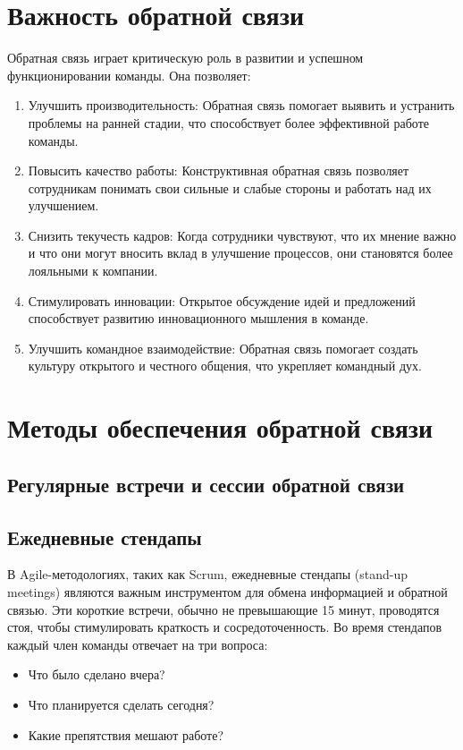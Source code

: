    \section{Важность обратной связи}
    Обратная связь играет критическую роль в развитии и успешном функционировании команды. Она позволяет:
    \begin{enumerate}
        \item Улучшить производительность: Обратная связь помогает выявить и устранить проблемы на ранней стадии, что способствует более эффективной работе команды.
        \item Повысить качество работы: Конструктивная обратная связь позволяет сотрудникам понимать свои сильные и слабые стороны и работать над их улучшением.
        \item Снизить текучесть кадров: Когда сотрудники чувствуют, что их мнение важно и что они могут вносить вклад в улучшение процессов, они становятся более лояльными к компании.
        \item Стимулировать инновации: Открытое обсуждение идей и предложений способствует развитию инновационного мышления в команде.
        \item Улучшить командное взаимодействие: Обратная связь помогает создать культуру открытого и честного общения, что укрепляет командный дух.
    \end{enumerate}

    \section{Методы обеспечения обратной связи}

    \subsection*{Регулярные встречи и сессии обратной связи}
    
    \subsection*{Ежедневные стендапы}
    В Agile-методологиях, таких как Scrum, ежедневные стендапы (stand-up meetings) являются важным инструментом для обмена информацией и обратной связью. Эти короткие встречи, обычно не превышающие 15 минут, проводятся стоя, чтобы стимулировать краткость и сосредоточенность. Во время стендапов каждый член команды отвечает на три вопроса:
    
    \begin{itemize}
        \item Что было сделано вчера?
        \item Что планируется сделать сегодня?
        \item Какие препятствия мешают работе?
    \end{itemize}

